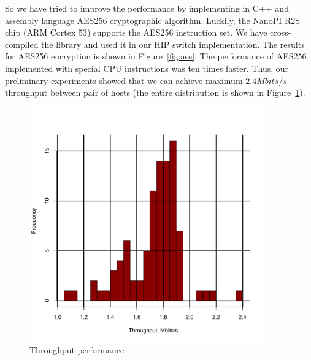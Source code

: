 So we have tried to improve the performance by implementing in C++ and assembly language
AES256 cryptographic algorithm. Luckily, the NanoPI R2S chip (ARM Cortex 
53) supports the AES256 instruction set. We have cross-compiled the 
library and used it in our HIP switch implementation. The results for AES256 
encryption is shown in Figure~\ref{fig:aes}. The performance of AES256 
implemented with special CPU instructions was ten times faster. Thus, our 
preliminary experiments showed that we can achieve maximum $2.4 Mbits/s$ 
throughput between pair of hosts (the entire distribution is shown in Figure~\ref{fig:tput}).


\begin{figure}[h!]
\centering
\includegraphics[width=0.9\textwidth]{graphics/iperf.pdf}
\caption{Throughput performance}
\label{fig:tput}
\end{figure}




